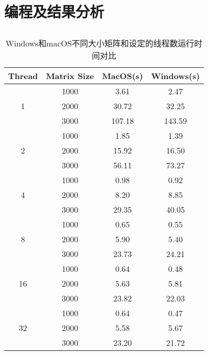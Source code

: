 \documentclass{article}
\begin{document}
\section{编程及结果分析}
\subsection{}
\subsection{}
\subsection{}
\begin{table}[ht]
    \centering
    \begin{tabular}{cccc}
    \toprule
    \textbf{Thread} & \textbf{Matrix Size} & \textbf{MacOS(s)} & \textbf{Windows(s)} \\
    \midrule
    \multirow{3}{*}{1} & 1000 & 3.61 & 2.47 \\
                       & 2000 & 30.72 & 32.25 \\
                       & 3000 & 107.18 & 143.59 \\
    \midrule
    \multirow{3}{*}{2} & 1000 & 1.85 & 1.39 \\
                       & 2000 & 15.92 & 16.50 \\
                       & 3000 & 56.11 & 73.27 \\
    \midrule
    \multirow{3}{*}{4} & 1000 & 0.98 & 0.92 \\
                       & 2000 & 8.20 & 8.85 \\
                       & 3000 & 29.35 & 40.05 \\
    \midrule
    \multirow{3}{*}{8} & 1000 & 0.65 & 0.55 \\
                       & 2000 & 5.90 & 5.40 \\
                       & 3000 & 23.73 & 24.21 \\
    \midrule
    \multirow{3}{*}{16} & 1000 & 0.64 & 0.48 \\
                        & 2000 & 5.63 & 5.81 \\
                        & 3000 & 23.82 & 22.03 \\
    \midrule
    \multirow{3}{*}{32} & 1000 & 0.64 & 0.47 \\
                        & 2000 & 5.58 & 5.67 \\
                        & 3000 & 23.20 & 21.72 \\
    \bottomrule
    \end{tabular}
    \caption{Windows和macOS不同大小矩阵和设定的线程数运行时间对比}
\end{table}
\end{document}
